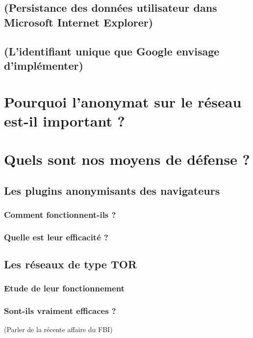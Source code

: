 \documentclass[a4paper,12pt,french]{report}
\begin{document}
	\section{(Persistance des données utilisateur dans Microsoft Internet Explorer)}
		
	\section{(L'identifiant unique que Google envisage d'implémenter)}
		
\chapter{Pourquoi l'anonymat sur le réseau est-il important ?}
	
\chapter{Quels sont nos moyens de défense ?}
	\section{Les plugins anonymisants des navigateurs}
		
		\subsection{Comment fonctionnent-ils ?}
			
		\subsection{Quelle est leur efficacité ?}
			
	\section{Les réseaux de type TOR}
		
		\subsection{Etude de leur fonctionnement}
			
		\subsection{Sont-ils vraiment efficaces ?}
			(Parler de la récente affaire du FBI)
			
\end{document}
